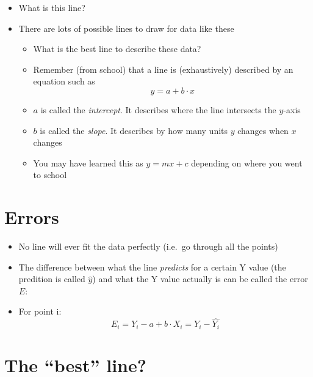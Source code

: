 \documentclass[]{article}
\providecommand{\tightlist}{%
  \setlength{\itemsep}{0pt}\setlength{\parskip}{0pt}}
\begin{document}
\begin{itemize}
\tightlist
\item
  What is this line?
\item
  There are lots of possible lines to draw for data like these

  \begin{itemize}
  \tightlist
  \item
    What is the best line to describe these data?
  \item
    Remember (from school) that a line is (exhaustively) described by an
    equation such as \[y = a+b\cdot x\]
  \item
    \(a\) is called the \emph{intercept}. It describes where the line
    intersects the \(y\)-axis
  \item
    \(b\) is called the \emph{slope}. It describes by how many units
    \(y\) changes when \(x\) changes
  \item
    You may have learned this as \(y = mx + c\) depending on where you
    went to school
  \end{itemize}
\end{itemize}

\section{Errors}\label{errors}

\begin{itemize}
\tightlist
\item
  No line will ever fit the data perfectly (i.e.~go through all the
  points)
\item
  The difference between what the line \emph{predicts} for a certain Y
  value (the predition is called \(\hat{y}\)) and what the Y value
  actually is can be called the error \(E\):
\item
  For point i: \[E_i = Y_i - a + b\cdot X_i = Y_i - \hat{Y_i}\]
\end{itemize}

\section{\texorpdfstring{The ``best''
line?}{The best line?}}\label{the-best-line}
\end{document}
